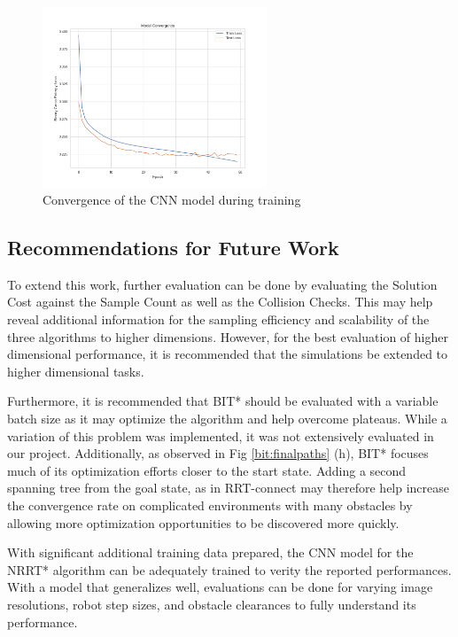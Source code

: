 \documentclass{article}
\newcommand*{\varfont}{\fontfamily{pcr}\selectfont}
\begin{document}
\begin{figure}[H]
\includegraphics[width=0.6\textwidth]{model_convergence}
\centering
\caption{Convergence of the CNN model during training}
\label{fig:convergence}
\end{figure}

\subsection{Recommendations for Future Work}
\label{sec:future_work}
To extend this work, further evaluation can be done by evaluating the Solution Cost against the Sample Count as well as the Collision Checks. This may help reveal additional information for the sampling efficiency and scalability of the three algorithms to higher dimensions. However, for the best evaluation of higher dimensional performance, it is recommended that the simulations be extended to higher dimensional tasks.

Furthermore, it is recommended that BIT* should be evaluated with a variable batch size as it may optimize the algorithm and help overcome plateaus. While a variation of this problem was implemented, it was not extensively evaluated in our project. Additionally, as observed in Fig \ref{bit:finalpaths} (h), BIT* focuses much of its optimization efforts closer to the {\varfont start} state. Adding a second spanning tree from the goal state, as in RRT-connect \cite{RRTConnect} may therefore help increase the convergence rate on complicated environments with many obstacles by allowing more optimization opportunities to be discovered more quickly.

With significant additional training data prepared, the CNN model for the NRRT* algorithm can be adequately trained to verity the reported performances. With a model that generalizes well, evaluations can be done for varying image resolutions, robot step sizes, and obstacle clearances to fully understand its performance.
\end{document}

